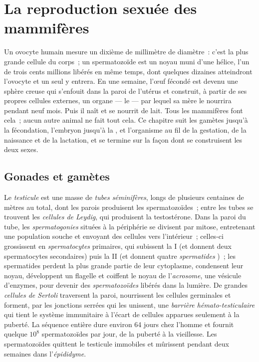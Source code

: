 \chapter{La reproduction sexuée des mammifères}\label{ch:b2:mammal-reproduction}

Un ovocyte humain mesure un dixième de millimètre de diamètre~: c'est la
plus grande cellule du corps~; un spermatozoïde est un noyau muni d'une
hélice, l'un de trois cents millions libérés en même temps, dont
quelques dizaines atteindront l'ovocyte et un seul y entrera. En une
semaine, l'œuf fécondé est devenu une sphère creuse qui s'enfouit dans
la paroi de l'utérus et construit, à partir de ses propres cellules
externes, un organe --- le  --- par lequel sa mère le nourrira
pendant neuf mois. Puis il naît et se nourrit de lait. Tous les
mammifères font cela~; aucun autre animal ne fait tout cela. Ce chapitre
suit les gamètes jusqu'à la fécondation, l'embryon jusqu'à la ,
et l'organisme au fil de la gestation, de la naissance et de la
lactation, et se termine sur la façon dont se construisent les deux
sexes.

\section{Gonades et gamètes}

\begin{definition}\label{def:b2:mammal-reproduction:testis}
Le \emph{testicule} est une masse de \emph{tubes séminifères}, longs de
plusieurs centaines de mètres au total, dont les parois produisent les
spermatozoïdes~; entre les tubes se trouvent les \emph{cellules de
Leydig}, qui produisent la testostérone. Dans la paroi du tube, les
\emph{spermatogonies} situées à la périphérie se divisent par mitose,
entretenant une population souche et envoyant des cellules vers
l'intérieur~; celles-ci grossissent en \emph{spermatocytes} primaires,
qui subissent la  I (et donnent deux spermatocytes secondaires)
puis la  II (et donnent quatre \emph{spermatides} )~; les
spermatides perdent la plus grande partie de leur cytoplasme,
condensent leur noyau, développent un flagelle et coiffent le noyau de
l'\emph{acrosome}, une vésicule d'enzymes, pour devenir des
\emph{spermatozoïdes} libérés dans la lumière. De grandes
\emph{cellules de Sertoli} traversent la paroi, nourrissent les
cellules germinales et forment, par les jonctions serrées qui les
unissent, une \emph{barrière hémato-testiculaire} qui tient le système
immunitaire à l'écart de cellules apparues seulement à la puberté. La
séquence entière dure environ \num{64} jours chez l'homme et fournit
quelque $10^{8}$ spermatozoïdes par jour, de la puberté à la
vieillesse. Les spermatozoïdes quittent le testicule immobiles et
mûrissent pendant deux semaines dans l'\emph{épididyme}.
\end{definition}

